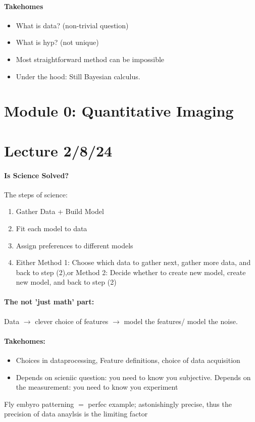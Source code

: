 \documentclass[../main.tex]{subfiles}
\begin{document}
\paragraph*{Takehomes}
\begin{itemize}
    \item What is data? (non-trivial question)
    \item What is hyp? (not unique)
    \item Most straightforward method can be impossible
    \item Under the hood: Still Bayesian calculus.
\end{itemize}

\newpage
\section{Module 0: Quantitative Imaging}
\section*{Lecture 2/8/24}
\barh \vspace{10px}

\paragraph*{Is Science Solved?}
The steps of science:
\begin{enumerate}
    \item Gather Data + Build Model
    \item Fit each model to data
    \item Assign preferences to different models
    \item Either Method 1: Choose which data to gather next, gather more data, and back to step (2),or
    Method 2: Decide whether to create new model, create new model, and back to step (2)
\end{enumerate}

\paragraph*{The not 'just math' part:} Data $\to$ clever choice of features $\to$ model the
features/ model the noise.

\paragraph*{Takehomes:}
\begin{itemize}
    \item Choices in dataprocessing, Feature definitions, choice of data acquisition
    \item Depends on scieniic question: you need to know you subjective. Depends on the measurement:
    you need to know you experiment
\end{itemize}
Fly embyro patterning $=$ perfec example; astonishingly precise, thus the precision of data anaylsis
is the limiting factor
\end{document}
